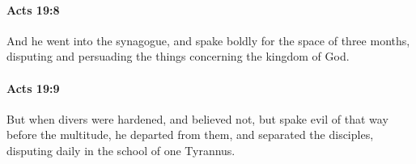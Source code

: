 		\paragraph{Acts 19:8} %
			\label{ACTS-19-8}

			And he went into the synagogue, and spake boldly for the space of three months, disputing and persuading the things concerning the kingdom of God.

			\begin{framed}
			\scriptsize
				\begin{compactdesc}
					\item[SBLG] 
				\end{compactdesc}
			\end{framed}

		\paragraph{Acts 19:9} %
			\label{ACTS-19-9}

			But when divers were hardened, and believed not, but spake evil of that way before the multitude, he departed from them, and separated the disciples, disputing daily in the school of one Tyrannus.

